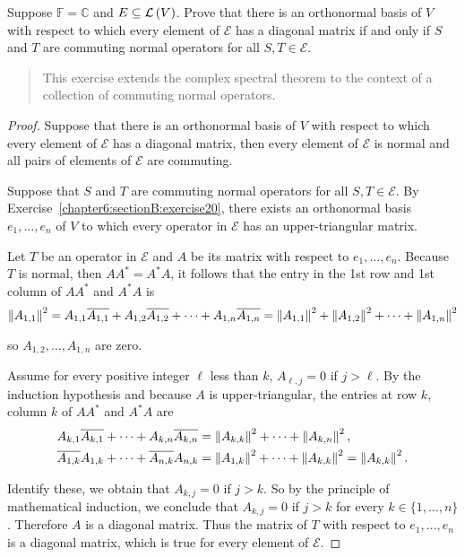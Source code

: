 \begin{exercise}\label{chapter7:sectionB:exercise16}
    Suppose $\mathbb{F} = \mathbb{C}$ and $E \subseteq \mathcal{L}\left({V}\right)$. Prove that there is an orthonormal basis of $V$ with respect to which every element of $\mathcal{E}$ has a diagonal matrix if and only if $S$ and $T$ are commuting normal operators for all $S, T \in \mathcal{E}$.
\end{exercise}

\begin{quote}
    This exercise extends the complex spectral theorem to the context of a collection of commuting normal operators.
\end{quote}

\begin{proof}
    Suppose that there is an orthonormal basis of $V$ with respect to which every element of $\mathcal{E}$ has a diagonal matrix, then every element of $\mathcal{E}$ is normal and all pairs of elements of $\mathcal{E}$ are commuting.

    \bigskip

    Suppose that $S$ and $T$ are commuting normal operators for all $S, T \in \mathcal{E}$. By Exercise~\ref{chapter6:sectionB:exercise20}, there exists an orthonormal basis $e_{1}, \ldots, e_{n}$ of $V$ to which every operator in $\mathcal{E}$ has an upper-triangular matrix.

    Let $T$ be an operator in $\mathcal{E}$ and $A$ be its matrix with respect to $e_{1}, \ldots, e_{n}$. Because $T$ is normal, then $AA^{*} = A^{*}A$, it follows that the entry in the 1st row and 1st column of $AA^{*}$ and $A^{*}A$ is
    \[
        \left\Vert{A_{1,1}}\right\Vert^{2} = A_{1,1}\overline{A_{1,1}} + A_{1,2}\overline{A_{1,2}} + \cdots + A_{1,n}\overline{A_{1,n}} = \left\Vert{A_{1,1}}\right\Vert^{2} + \left\Vert{A_{1,2}}\right\Vert^{2} + \cdots + \left\Vert{A_{1,n}}\right\Vert^{2}
    \]

    so $A_{1,2}, \ldots, A_{1,n}$ are zero.

    Assume for every positive integer $\ell$ less than $k$, $A_{\ell, j} = 0$ if $j > \ell$. By the induction hypothesis and because $A$ is upper-triangular, the entries at row $k$, column $k$ of $AA^{*}$ and $A^{*}A$ are
    \begin{align*}
        A_{k,1}\overline{A_{k,1}} + \cdots + A_{k,n}\overline{A_{k,n}} & = \left\Vert{A_{k,k}}\right\Vert^{2} + \cdots + \left\Vert{A_{k,n}}\right\Vert^{2},                      \\
        \overline{A_{1,k}}A_{1,k} + \cdots + \overline{A_{n,k}}A_{n,k} & = \left\Vert{A_{1,k}}\right\Vert^{2} + \cdots + \left\Vert{A_{k,k}}\right\Vert^{2} = \left\Vert{A_{k,k}}\right\Vert^{2}.
    \end{align*}

    Identify these, we obtain that $A_{k,j} = 0$ if $j > k$. So by the principle of mathematical induction, we conclude that $A_{k, j} = 0$ if $j > k$ for every $k\in\{ 1,\ldots, n \}$. Therefore $A$ is a diagonal matrix. Thus the matrix of $T$ with respect to $e_{1}, \ldots, e_{n}$ is a diagonal matrix, which is true for every element of $\mathcal{E}$.
\end{proof}
\newpage

